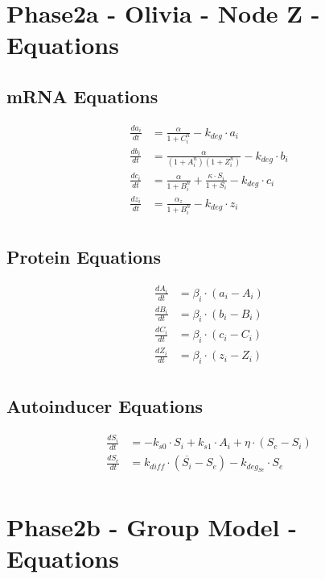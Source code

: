 \documentclass[fleqn]{article} %
\begin{document}
\pagebreak

\section*{Phase2a - Olivia - Node Z - Equations}

\subsection*{mRNA Equations}
\begin{align*}
\frac{da_i}{dt} &= \frac{\alpha}{1 + C_i^n} - k_{deg} \cdot a_i \\
\frac{db_i}{dt} &= \frac{\alpha}{(1 + A_i^n)(1 + Z_i^n)} - k_{deg} \cdot b_i \\
\frac{dc_i}{dt} &= \frac{\alpha}{1 + B_i^n} + \frac{\kappa \cdot S_i}{1 + S_i} - k_{deg} \cdot c_i \\
\frac{dz_i}{dt} &= \frac{\alpha_z}{1 + B_i^n} - k_{deg} \cdot z_i \\
\end{align*}

\subsection*{Protein Equations}
\begin{align*}
\frac{dA_i}{dt} &= \beta_i \cdot (a_i - A_i) \\
\frac{dB_i}{dt} &= \beta_i \cdot (b_i - B_i) \\
\frac{dC_i}{dt} &= \beta_i \cdot (c_i - C_i) \\
\frac{dZ_i}{dt} &= \beta_i \cdot (z_i - Z_i) \\
\end{align*}

\subsection*{Autoinducer Equations}
\begin{align*}
\frac{dS_i}{dt} &= -k_{s0} \cdot S_i + k_{s1} \cdot A_i + \eta \cdot (S_e - S_i) \\
\frac{dS_e}{dt} &= k_{diff} \cdot (\overline{S_i} - S_e) - k_{deg_{Se}} \cdot S_e \\
\end{align*}

\pagebreak

\section*{Phase2b - Group Model - Equations}
\end{document}
